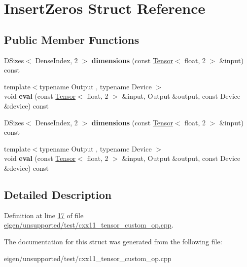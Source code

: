 \hypertarget{struct_insert_zeros}{}\section{Insert\+Zeros Struct Reference}
\label{struct_insert_zeros}
\subsection*{Public Member Functions}
\begin{DoxyCompactItemize}
\item 
\mbox{\label{struct_insert_zeros_a5a96e9469ac22c7f8efb68340b9535af}} 
D\+Sizes$<$ Dense\+Index, 2 $>$ {\bfseries dimensions} (const \hyperlink{class_eigen_1_1_tensor}{Tensor}$<$ float, 2 $>$ \&input) const
\item 
\mbox{\label{struct_insert_zeros_aeb6f51a1970dc2dce7870ddf84554c31}} 
{\footnotesize template$<$typename Output , typename Device $>$ }\\void {\bfseries eval} (const \hyperlink{class_eigen_1_1_tensor}{Tensor}$<$ float, 2 $>$ \&input, Output \&output, const Device \&device) const
\item 
\mbox{\label{struct_insert_zeros_a5a96e9469ac22c7f8efb68340b9535af}} 
D\+Sizes$<$ Dense\+Index, 2 $>$ {\bfseries dimensions} (const \hyperlink{class_eigen_1_1_tensor}{Tensor}$<$ float, 2 $>$ \&input) const
\item 
\mbox{\label{struct_insert_zeros_aeb6f51a1970dc2dce7870ddf84554c31}} 
{\footnotesize template$<$typename Output , typename Device $>$ }\\void {\bfseries eval} (const \hyperlink{class_eigen_1_1_tensor}{Tensor}$<$ float, 2 $>$ \&input, Output \&output, const Device \&device) const
\end{DoxyCompactItemize}


\subsection{Detailed Description}


Definition at line \hyperlink{eigen_2unsupported_2test_2cxx11__tensor__custom__op_8cpp_source_l00017}{17} of file \hyperlink{eigen_2unsupported_2test_2cxx11__tensor__custom__op_8cpp_source}{eigen/unsupported/test/cxx11\+\_\+tensor\+\_\+custom\+\_\+op.\+cpp}.



The documentation for this struct was generated from the following file\+:\begin{DoxyCompactItemize}
\item 
eigen/unsupported/test/cxx11\+\_\+tensor\+\_\+custom\+\_\+op.\+cpp\end{DoxyCompactItemize}
